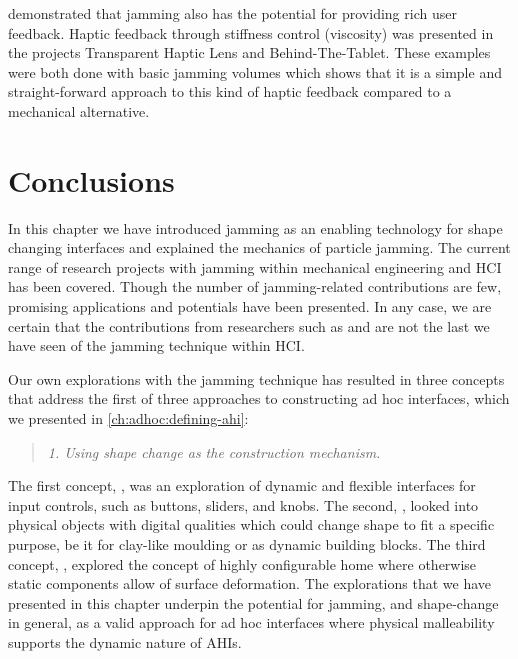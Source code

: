 \citet{follmer2012jamming} demonstrated that jamming also has the potential for providing rich user feedback. 
Haptic feedback through stiffness control (viscosity) was presented in the projects Transparent Haptic Lens and Behind-The-Tablet.
These examples were both done with basic jamming volumes which shows that it is a simple and straight-forward approach to this kind of haptic feedback compared to a mechanical alternative.

\section{Conclusions}
In this chapter we have introduced jamming as an enabling technology for shape changing interfaces and explained the mechanics of particle jamming.
The current range of research projects with jamming within mechanical engineering and HCI has been covered.
Though the number of jamming-related contributions are few, promising applications and potentials have been presented.
In any case, we are certain that the contributions from researchers such as \citet{follmer2012jamming} and \citet{matoba2012claytricsurface} are not the last we have seen of the jamming technique within HCI.

Our own explorations with the jamming technique has resulted in three concepts that address the first of three approaches to constructing ad hoc interfaces, which we presented in \autoref{ch:adhoc:defining-ahi}:
\begin{quotation}
	\emph{1. Using shape change as the construction mechanism.}
\end{quotation}
The first concept, \emph{}, was an exploration of dynamic and flexible interfaces for input controls, such as buttons, sliders, and knobs.
The second, \emph{}, looked into physical objects with digital qualities which could change shape to fit a specific purpose, be it for clay-like moulding or as dynamic building blocks.
The third concept, \emph{}, explored the concept of highly configurable home where otherwise static components allow of surface deformation.
The explorations that we have presented in this chapter underpin the potential for jamming, and shape-change in general, as a valid approach for ad hoc interfaces where physical malleability supports the dynamic nature of AHIs.
